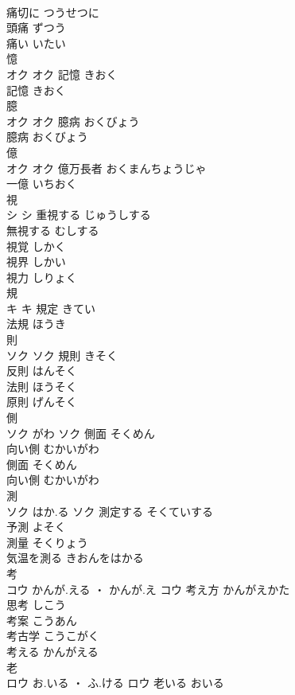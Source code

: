 \documentclass[8pt]{extreport}
\begin{document}
\begin{CJK}{UTF8}{min}
\\	痛切に	つうせつに	
\\	頭痛	ずつう	
\\	痛い	いたい	
\\	憶	
\\	オク		オク	記憶	きおく	
\\	記憶	きおく	
\\	臆	
\\	オク		オク	臆病	おくびょう	
\\	臆病	おくびょう	
\\	億	
\\	オク		オク													億万長者	おくまんちょうじゃ	
\\	一億	いちおく	
\\	視	
\\	シ		シ	重視する	じゅうしする	
\\	無視する	むしする	
\\	視覚	しかく	
\\	視界	しかい	
\\	視力	しりょく	
\\	規	
\\	キ		キ	規定	きてい	
\\	法規	ほうき	
\\	則	
\\	ソク		ソク	規則	きそく	
\\	反則	はんそく	
\\	法則	ほうそく	
\\	原則	げんそく	
\\	側	
\\	ソク	がわ	ソク	側面	そくめん	
\\	向い側	むかいがわ	
\\	側面	そくめん	
\\	向い側	むかいがわ	
\\	測	
\\	ソク	はか.る	ソク	測定する	そくていする	
\\	予測	よそく	
\\	測量	そくりょう	
\\	気温を測る	きおんをはかる	
\\	考	
\\	コウ	かんが.える ・ かんが.え	コウ	考え方	かんがえかた	
\\	思考	しこう	
\\	考案	こうあん	
\\	考古学	こうこがく	
\\	考える	かんがえる	
\\	老	
\\	ロウ	お.いる ・ ふ.ける	ロウ	老いる	おいる	

\end{CJK}
\end{document}

